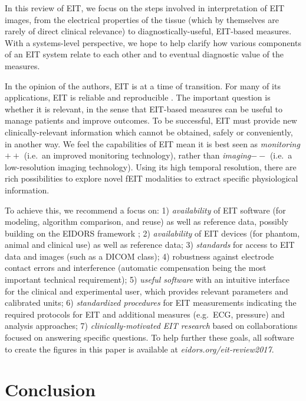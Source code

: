\documentclass[12pt]{article} \usepackage[margin=3cm]{geometry} \usepackage[margin=20pt,font=small,labelfont=bf]{caption}\def\TBLWIDA{35mm}\def\TBLWIDB{95mm}
\begin{document}
In this review of EIT, we focus
on the steps involved in interpretation
of EIT images, from the electrical properties of the
tissue (which by themselves are rarely of direct
clinical relevance) to diagnostically-useful,
EIT-based measures. With a systems-level perspective,
we hope to help clarify how various components of an EIT system
relate to each other and to eventual diagnostic value of the measures.

In the opinion of the authors, EIT is at a time of transition.
For many of its applications, EIT is reliable
and reproducible \cite{Adler2012Whither, Frerichs2017Chest}. The
important question is whether it is relevant, in the sense that
EIT-based measures can be useful to manage patients and improve outcomes.
To be successful, EIT must provide new clinically-relevant
information which cannot be obtained, safely or conveniently, in another way.
We feel the capabilities of EIT mean it is 
best seen as {\em monitoring$++$}
 (i.e.\ an improved  monitoring technology),
rather than {\em imaging$--$}
 (i.e.\ a low-resolution imaging technology).
Using its high temporal resolution, there are rich possibilities
to explore novel fEIT modalities to extract specific physiological
information.

To achieve this, we recommend a focus on:
1) {\em availability} of EIT software (for modeling, algorithm comparison,
   and reuse) as well as reference data, possibly building on the
   EIDORS framework \cite{Adler2006EIDORS};  
2) {\em availability} of EIT devices (for phantom, animal and clinical
   use) as well as reference data;
3) {\em standards} for access to EIT data and images (such as a DICOM class);
4) {\rm robustness} against electrode contact errors and interference
   (automatic compensation being the most important technical 
   requirement);
5) {\em useful software} with an intuitive interface for the clinical
   and experimental user, which provides relevant parameters
   and calibrated units;
6) {\em standardized procedures} for EIT measurements indicating
   the required protocols for EIT and additional measures (e.g.\ 
   ECG, pressure) and analysis approaches;
7) {\em clinically-motivated EIT research} based on collaborations
   focused on answering specific questions.
To help further these goals, all software to create the
figures in this paper is available at {\em eidors.org/eit-review2017}.


\section{Conclusion}
\end{document}
